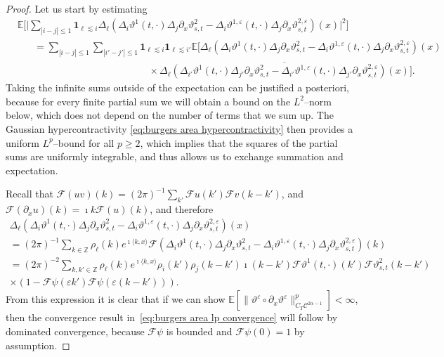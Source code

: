 \documentclass[11pt,a4paper]{article}
\theoremstyle{remark}
\newcommand{\Z}{\mathbb{Z}}
\newcommand{\E}{\mathbb{E}}
\newcommand{\CC}{\ensuremath{\mathscr{C}}}
\newcommand{\CF}{\ensuremath{\mathscr{F}}}
\begin{document}
\begin{proof}
   Let us start by estimating
   \begin{align}\label{e:burgers area pr1} \nonumber
      &\E\biggl[\biggl| \sum_{|i-j| \leqslant 1} \mathbf{1}_{\ell \lesssim i} \Delta_{\ell} ( \Delta_i \vartheta^1(t,\cdot) \Delta_j \partial_x \vartheta^2_{s,t} - \Delta_i \vartheta^{1,\varepsilon} (t,\cdot) \Delta_j \partial_x \vartheta^{2,\varepsilon}_{s,t})(x)\biggr|^2\biggr] \\ \nonumber
      &\hspace{20pt} = \sum_{| i - j | \leqslant 1} \sum_{| i' - j' | \leqslant 1} \mathbf{1}_{\ell \lesssim i} \mathbf{1}_{\ell \lesssim i'} \E[\Delta_{\ell} (\Delta_i \vartheta^1(t,\cdot) \Delta_j \partial_x \vartheta^2_{s,t} - \Delta_i \vartheta^{1,\varepsilon} (t,\cdot) \Delta_j \partial_x \vartheta^{2,\varepsilon}_{s,t})(x)\\
      &\hspace{160pt} \times \overline{\Delta_{\ell} ( \Delta_{i'} \vartheta^1(t,\cdot) \Delta_{j'} \partial_x \vartheta^2_{s,t} - \Delta_{i'} \vartheta^{1,\varepsilon} (t,\cdot) \Delta_{j'} \partial_x \vartheta^{2,\varepsilon}_{s,t})(x)}].
   \end{align}
   Taking the infinite sums outside of the expectation can be justified a posteriori, because for every finite partial sum we will obtain a bound on the $L^2$--norm below, which does not depend on the number of terms that we sum up. The Gaussian hypercontractivity \eqref{eq:burgers area hypercontractivity} then provides a uniform $L^p$--bound for all $p \geqslant 2$, which implies that the squares of the partial sums are uniformly integrable, and thus allows us to exchange summation and expectation.
   
   Recall that $\CF(u v)(k) = (2\pi)^{-1} \sum_{k'} \CF u(k') \CF v(k -k')$, and $\CF(\partial_x u)(k) = \imath k \CF(u)(k)$, and therefore 
   \begin{gather*}
      \Delta_{\ell} (\Delta_i \vartheta^1(t,\cdot) \Delta_j \partial_x \vartheta^2_{s,t} - \Delta_i \vartheta^{1,\varepsilon} (t,\cdot) \Delta_j \partial_x \vartheta^{2,\varepsilon}_{s,t})(x) \\
      = (2\pi)^{-1} \sum_{k \in \Z} \rho_\ell(k) e^{\imath \langle k, x \rangle} \CF(\Delta_i \vartheta^1(t,\cdot) \Delta_j \partial_x \vartheta^2_{s,t} - \Delta_i \vartheta^{1,\varepsilon} (t,\cdot) \Delta_j \partial_x \vartheta^{2,\varepsilon}_{s,t})(k) \\
      = (2\pi)^{-2} \sum_{k,k' \in \Z} \rho_\ell(k) e^{\imath \langle k, x \rangle} \rho_i(k') \rho_j(k-k') \imath (k-k') \CF \vartheta^1(t,\cdot)(k') \CF\vartheta^2_{s,t}(k-k') \\
      \times (1 - \CF \psi(\varepsilon k') \CF \psi(\varepsilon(k-k'))).
   \end{gather*}
   From this expression it is clear that if we can show $\E[\| \vartheta^\varepsilon \circ \partial_x \vartheta^\varepsilon \|_{C_T \CC^{2\alpha - 1}}^p] < \infty$, then the convergence result in~\eqref{eq:burgers area lp convergence} will follow by dominated convergence, because $\CF \psi$ is bounded and $\CF \psi(0) = 1$ by assumption.
   

\end{proof}
\end{document}
